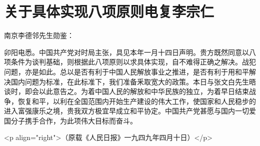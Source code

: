 \section[关于具体实现八项原则电复李宗仁（一九四九年四月八日）]{关于具体实现八项原则电复李宗仁}


南京李德邻先生勋鉴：

卯阳电悉。中国共产党对时局主张，具见本年一月十四日声明。贵方既然同意以八项条件为谈判基础，则根据此八项原则以求具体实现，自不难得正确之解决。战犯问题，亦是如此。总以是否有利于中国人民解放事业之推进，是否有利于用和平解决国内问题为标准，在此标准下，我们准备釆取宽大的政策。本日与张文白先生晤谈时，即会以此意告之。为着中国人民的解放和中华民族的独立，为着早日结束战争，恢复和平，以利在全国范围内开始生产建设的伟大工作，使国家和人民稳步的进入富强康乐之境，贵我双方极宜早成立和平协定。中国共产党甚愿与国内一切爱国分子携手合作，为此项伟大目标而奋斗。

<p align="right">（原载《人民日报》一九四九年四月十日）</p>

